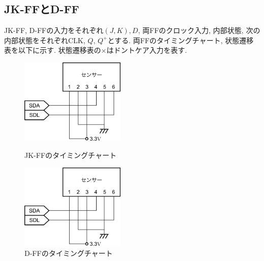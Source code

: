 \documentclass[titlepage]{jsarticle}
\begin{document}
  \subsection{JK-FFとD-FF}
    JK-FF, D-FFの入力をそれぞれ$(J, K), D$, 両FFのクロック入力,
    内部状態, 次の内部状態をそれぞれCLK, $Q$, $Q^+$とする.
    両FFのタイミングチャート, 状態遷移表を以下に示す.
    状態遷移表の$\times$はドントケア入力を表す.
    \begin{figure}[h]
      \begin{minipage}{0.49\hsize}
        \centering
        \includegraphics[width=5cm]{images/haisen.pdf}
        \caption{JK-FFのタイミングチャート}
      \end{minipage}
      \begin{minipage}{0.49\hsize}
        \centering
        \includegraphics[width=5cm]{images/haisen.pdf}
        \caption{D-FFのタイミングチャート}
      \end{minipage}
    \end{figure}
\end{document}
